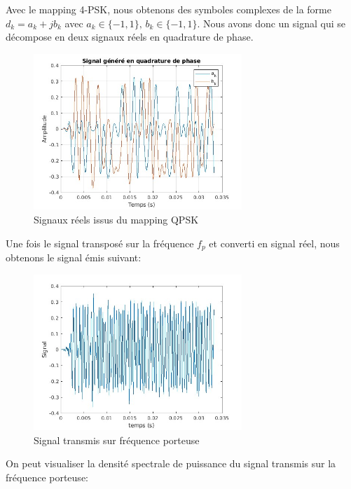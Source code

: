 \documentclass[a4paper, 12pt]{article}
\begin{document}
Avec le mapping 4-PSK, nous obtenons des symboles complexes de la forme $d_k =
a_k + jb_k$ avec $a_k \in \{-1, 1\}, \, b_k \in \{-1, 1\}$. Nous avons donc un
signal qui se décompose en deux signaux réels en quadrature de phase.

\clearpage
\vspace*{-2cm}
\begin{figure}[H]
    \centering
    \includegraphics[width=0.7\textwidth]{graphics/1-1.jpg}
    \caption{Signaux réels issus du mapping QPSK}
    \label{fig:sig_quad}
\end{figure}

Une fois le signal transposé sur la fréquence $f_p$ et converti en signal réel,
nous obtenons le signal émis suivant:

\begin{figure}[H]
    \centering
    \includegraphics[width=0.7\textwidth]{graphics/1-2.jpg}
    \caption{Signal transmis sur fréquence porteuse}
    \label{fig:sig_porteuse}
\end{figure}

On peut visualiser la densité spectrale de puissance du signal transmis sur la
fréquence porteuse:
\end{document}
